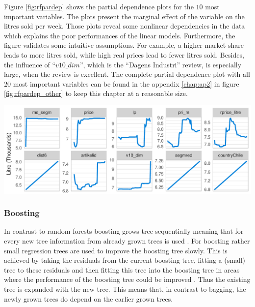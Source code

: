 \documentclass[11pt,]{article}
\let\origfigure\figure
\let\endorigfigure\endfigure
\renewenvironment{figure}[1][2] {
    \expandafter\origfigure\expandafter[H]
} {
    \endorigfigure
}
\begin{document}
Figure \ref{fig:rfpardep} shows the partial dependence plots for the
\(10\) most important variables. The plots present the marginal effect
of the variable on the litres sold per week. Those plots reveal some
nonlinear dependencies in the data which explains the poor performances
of the linear models. Furthermore, the figure validates some intuitive
assumptions. For example, a higher market share leads to more litres
sold, while high real prices lead to fewer litres sold. Besides, the
influence of \enquote{\(v10\_dim\)}, which is the \enquote{Dagens
Industri} review, is especially large, when the review is excellent. The
complete partial dependence plot with all \(20\) most important
variables can be found in the appendix \ref{chap:ap2} in figure
\ref{fig:rfpardep_other} to keep this chapter at a reasonable size.

\begin{figure}
\centering
\includegraphics{../00_data/output_paper/11_par_dep_random_forest.pdf}
\caption{\label{fig:rfpardep}Random Forest: Partial Dependence Plots.}
\end{figure}

\hypertarget{boosting}{%
\subsubsection{Boosting}\label{boosting}}

In contrast to random forests boosting grows tree sequentially meaning
that for every new tree information from already grown trees is used
\autocite[Cf.][p. 322.]{James2014}. For boosting rather small regression
trees are used to improve the boosting tree slowly. This is achieved by
taking the residuals from the current boosting tree, fitting a (small)
tree to these residuals and then fitting this tree into the boosting
tree in areas where the performance of the boosting tree could be
improved \autocite[Cf.][p. 322.]{James2014}. Thus the existing tree is
expanded with the new tree. This means that, in contrast to bagging, the
newly grown trees do depend on the earlier grown trees.
\end{document}
